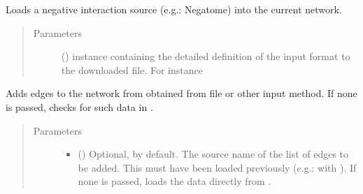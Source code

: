 \documentclass[letterpaper,10pt,english]{sphinxmanual}
\begin{document}
\begin{fulllineitems}
\begin{fulllineitems}
\begin{quote}
\begin{description}
\begin{itemize}
\end{itemize}

\end{description}\end{quote}

\end{fulllineitems}


\begin{fulllineitems}
\label{\detokenize{reference:pypath.main.PyPath.apply_negative}}
Loads a negative interaction source (e.g.: Negatome) into the
current network.
\begin{quote}\begin{description}
\item[{Parameters}] \leavevmode
{} () \textendash{}  instance
containing the detailed definition of the input format to
the downloaded file. For instance

\end{description}\end{quote}

\end{fulllineitems}


\begin{fulllineitems}
\label{\detokenize{reference:pypath.main.PyPath.attach_network}}
Adds edges to the network from  obtained from file or
other input method. If none is passed, checks for such data in
.
\begin{quote}\begin{description}
\item[{Parameters}] \leavevmode\begin{itemize}
\item {} 
 () \textendash{} Optional,  by default. The source name of the list
of edges to be added. This must have been loaded previously
(e.g.: with {\hyperref[\detokenize{reference:pypath.main.PyPath.read_data_file}]{}}).
If none is passed, loads the data directly from
.


\end{itemize}
\end{description}
\end{quote}
\end{fulllineitems}
\end{fulllineitems}
\end{document}
